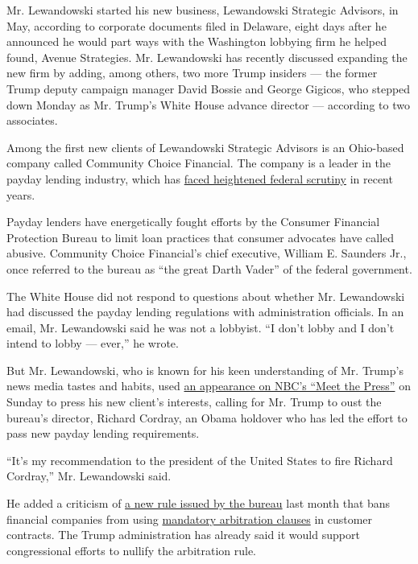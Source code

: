 Mr. Lewandowski started his new business, Lewandowski Strategic
Advisors, in May, according to corporate documents filed in Delaware,
eight days after he announced he would part ways with the Washington
lobbying firm he helped found, Avenue Strategies. Mr. Lewandowski has
recently discussed expanding the new firm by adding, among others, two
more Trump insiders --- the former Trump deputy campaign manager David
Bossie and George Gigicos, who stepped down Monday as Mr. Trump's White
House advance director --- according to two associates.

Among the first new clients of Lewandowski Strategic Advisors is an
Ohio-based company called Community Choice Financial. The company is a
leader in the payday lending industry, which has
\href{https://www.nytimes.com/2016/06/02/business/dealbook/payday-borrowings-debt-spiral-to-be-curtailed.html}{faced
heightened federal scrutiny} in recent years.

Payday lenders have energetically fought efforts by the Consumer
Financial Protection Bureau to limit loan practices that consumer
advocates have called abusive. Community Choice Financial's chief
executive, William E. Saunders Jr., once referred to the bureau as ``the
great Darth Vader'' of the federal government.

The White House did not respond to questions about whether Mr.
Lewandowski had discussed the payday lending regulations with
administration officials. In an email, Mr. Lewandowski said he was not a
lobbyist. ``I don't lobby and I don't intend to lobby --- ever,'' he
wrote.

But Mr. Lewandowski, who is known for his keen understanding of Mr.
Trump's news media tastes and habits, used
\href{http://www.nbcnews.com/meet-the-press/video/fire-richard-cordray-lewandowski-to-new-chief-of-staff-1013246531986}{an
appearance on NBC's ``Meet the Press''} on Sunday to press his new
client's interests, calling for Mr. Trump to oust the bureau's director,
Richard Cordray, an Obama holdover who has led the effort to pass new
payday lending requirements.

``It's my recommendation to the president of the United States to fire
Richard Cordray,'' Mr. Lewandowski said.

He added a criticism of
\href{https://www.consumerfinance.gov/about-us/newsroom/cfpb-issues-rule-ban-companies-using-arbitration-clauses-deny-groups-people-their-day-court/}{a
new rule issued by the bureau} last month that bans financial companies
from using
\href{https://www.nytimes.com/2015/11/01/business/dealbook/arbitration-everywhere-stacking-the-deck-of-justice.html}{mandatory
arbitration clauses} in customer contracts. The Trump administration has
already said it would support congressional efforts to nullify the
arbitration rule.

